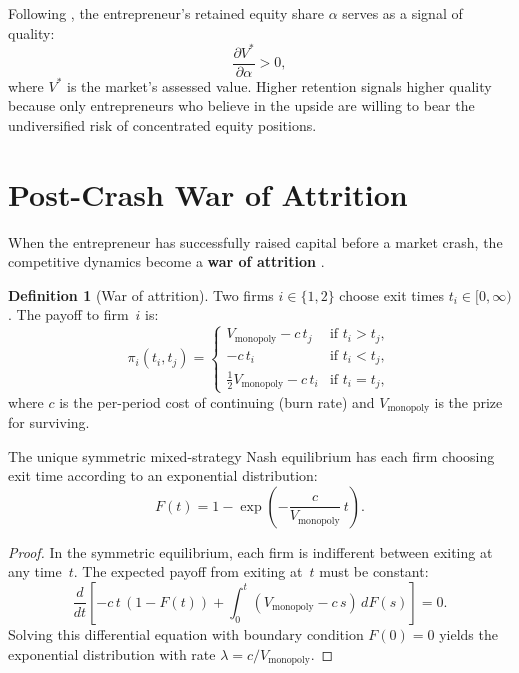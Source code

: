 \documentclass[12pt,a4paper,oneside]{book}
\theoremstyle{definition}
\newtheorem{definition}[theorem]{Definition}
\theoremstyle{remark}
\begin{document}
Following \citet{LelandPyle1977}, the entrepreneur's retained equity share
$\alpha$ serves as a signal of quality:
\begin{equation}\label{eq:leland_pyle}
  \frac{\partial V^*}{\partial \alpha} > 0,
\end{equation}
where $V^*$ is the market's assessed value. Higher retention signals higher
quality because only entrepreneurs who believe in the upside are willing to
bear the undiversified risk of concentrated equity positions.

\section{Post-Crash War of Attrition}

When the entrepreneur has successfully raised capital before a market crash,
the competitive dynamics become a \textbf{war of attrition}
\citep{MaynardSmith1974}.

\begin{definition}[War of attrition]
Two firms $i \in \{1,2\}$ choose exit times $t_i \in [0,\infty)$.
The payoff to firm~$i$ is:
\begin{equation}\label{eq:war_attrition}
  \pi_i(t_i, t_j) =
  \begin{cases}
    V_{\text{monopoly}} - c\,t_j & \text{if } t_i > t_j, \\
    -c\,t_i & \text{if } t_i < t_j, \\
    \frac{1}{2}V_{\text{monopoly}} - c\,t_i & \text{if } t_i = t_j,
  \end{cases}
\end{equation}
where $c$ is the per-period cost of continuing (burn rate) and
$V_{\text{monopoly}}$ is the prize for surviving.
\end{definition}

The unique symmetric mixed-strategy Nash equilibrium has each firm choosing
exit time according to an exponential distribution:
\begin{equation}\label{eq:war_equilibrium}
  F(t) = 1 - \exp\!\left(-\frac{c}{V_{\text{monopoly}}}\,t\right).
\end{equation}

\begin{proof}
In the symmetric equilibrium, each firm is indifferent between exiting at any
time~$t$. The expected payoff from exiting at~$t$ must be constant:
\[
  \frac{d}{dt}\left[-c\,t\,(1-F(t))
    + \int_0^t (V_{\text{monopoly}} - c\,s)\,dF(s)\right] = 0.
\]
Solving this differential equation with boundary condition $F(0) = 0$ yields the
exponential distribution with rate $\lambda = c / V_{\text{monopoly}}$.
\end{proof}
\end{document}
